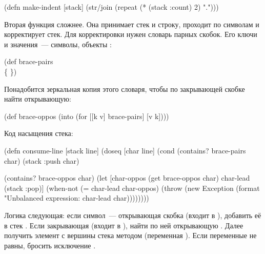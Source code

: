 \begin{english}
  \begin{clojure}
(defn make-indent [stack]
  (str/join (repeat (* (stack :count) 2) ".")))
  \end{clojure}
\end{english}


Вторая функция  сложнее. Она принимает стек и строку, проходит по символам и корректирует стек. Для корректировки нужен словарь парных скобок. Его ключи и значения~--- символы, объекты :

\begin{english}
  \begin{clojure}
(def brace-pairs
  {\( \)
   \[ \]
   \{ \}})
  \end{clojure}
\end{english}

Понадобится зеркальная копия этого словаря, чтобы по закрывающей скобке найти открывающую:

\begin{english}
  \begin{clojure}
(def brace-oppos
  (into {} (for [[k v] brace-pairs]
             [v k])))
  \end{clojure}
\end{english}

Код насыщения стека:

\begin{english}
  \begin{clojure/lines}
(defn consume-line [stack line]
  (doseq [char line]
    (cond
      (contains? brace-pairs char)
      (stack :push char)

      (contains? brace-oppos char)
      (let [char-oppos
            (get brace-oppos char)
            char-lead
            (stack :pop)]
        (when-not (= char-lead char-oppos)
          (throw
           (new Exception
                (format "Unbalanced expression: %
                        char-lead char))))))))
  \end{clojure/lines}
\end{english}

Логика следующая: если символ~--- открывающая скобка (входит в ), добавить её в стек . Если закрывающая (входит в ), найти по ней открывающую . Далее получить элемент с вершины стека методом  (переменная ). Если переменные не равны, бросить исключение .

